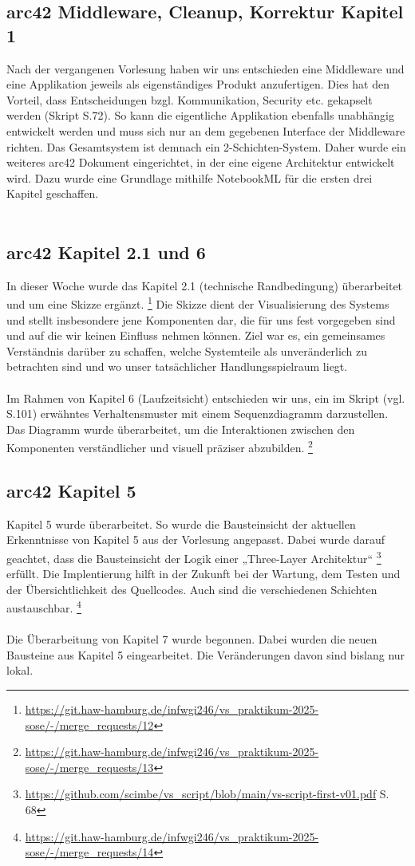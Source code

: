 \documentclass{article}
\begin{document}
\subsection{arc42 Middleware, Cleanup, Korrektur Kapitel 1}
Nach der vergangenen Vorlesung haben wir uns entschieden eine Middleware und eine Applikation jeweils als eigenständiges Produkt anzufertigen. Dies hat den Vorteil, dass Entscheidungen bzgl. Kommunikation, Security etc. gekapselt werden (Skript S.72). So kann die eigentliche Applikation ebenfalls unabhängig entwickelt werden und muss sich nur an dem gegebenen Interface der Middleware richten. Das Gesamtsystem ist demnach ein 2-Schichten-System. Daher wurde ein weiteres arc42 Dokument eingerichtet, in der eine eigene Architektur entwickelt wird. Dazu wurde eine Grundlage mithilfe NotebookML für die ersten drei Kapitel geschaffen.
\\\\


\subsection{arc42 Kapitel 2.1 und 6}
In dieser Woche wurde das Kapitel 2.1 (technische Randbedingung) überarbeitet und um eine Skizze ergänzt.
 \footnote{\url {https://git.haw-hamburg.de/infwgi246/vs_praktikum-2025-sose/-/merge_requests/12}}
Die Skizze dient der Visualisierung des Systems und stellt insbesondere jene Komponenten dar, die für uns fest vorgegeben sind und auf die wir keinen Einfluss nehmen können.
Ziel war es, ein gemeinsames Verständnis darüber zu schaffen, welche Systemteile als unveränderlich zu betrachten sind und wo unser tatsächlicher Handlungsspielraum liegt.
\\\\
Im Rahmen von Kapitel 6 (Laufzeitsicht) entschieden wir uns, ein im Skript (vgl. S.101) erwähntes Verhaltensmuster mit einem Sequenzdiagramm darzustellen.
Das Diagramm wurde überarbeitet, um die Interaktionen zwischen den Komponenten verständlicher und visuell präziser abzubilden.
\footnote{\url {https://git.haw-hamburg.de/infwgi246/vs_praktikum-2025-sose/-/merge_requests/13}}




\subsection{arc42 Kapitel 5}
Kapitel 5 wurde überarbeitet.
So wurde die Bausteinsicht der aktuellen Erkenntnisse von Kapitel 5 aus der Vorlesung angepasst. 
Dabei wurde darauf geachtet, dass die Bausteinsicht der Logik einer „Three-Layer Architektur“ \footnote{\url{https://github.com/scimbe/vs_script/blob/main/vs-script-first-v01.pdf} S. 68 } erfüllt.
Die Implentierung hilft in der Zukunft bei der Wartung, dem Testen und der Übersichtlichkeit des Quellcodes. Auch sind die verschiedenen Schichten austauschbar.
\footnote{\url{https://git.haw-hamburg.de/infwgi246/vs_praktikum-2025-sose/-/merge_requests/14}} 
\\\\
Die Überarbeitung von Kapitel 7 wurde begonnen. Dabei wurden die neuen Bausteine aus Kapitel 5 eingearbeitet. Die Veränderungen davon sind bislang nur lokal.
\end{document}
